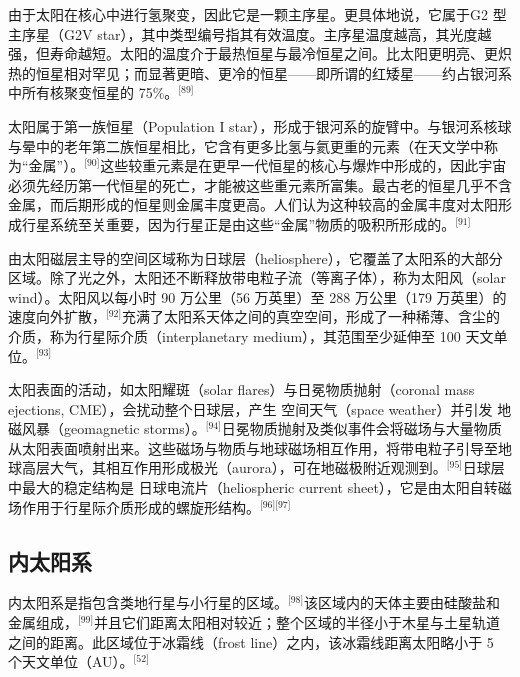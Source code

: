 由于太阳在核心中进行氢聚变，因此它是一颗主序星。更具体地说，它属于G2 型主序星（G2V star），其中类型编号指其有效温度。主序星温度越高，其光度越强，但寿命越短。太阳的温度介于最热恒星与最冷恒星之间。比太阳更明亮、更炽热的恒星相对罕见；而显著更暗、更冷的恒星——即所谓的红矮星——约占银河系中所有核聚变恒星的 75\%。\(^\text{[89]}\)

太阳属于第一族恒星（Population I star），形成于银河系的旋臂中。与银河系核球与晕中的老年第二族恒星相比，它含有更多比氢与氦更重的元素（在天文学中称为“金属”）。\(^\text{[90]}\)这些较重元素是在更早一代恒星的核心与爆炸中形成的，因此宇宙必须先经历第一代恒星的死亡，才能被这些重元素所富集。最古老的恒星几乎不含金属，而后期形成的恒星则金属丰度更高。人们认为这种较高的金属丰度对太阳形成行星系统至关重要，因为行星正是由这些“金属”物质的吸积所形成的。\(^\text{[91]}\)

由太阳磁层主导的空间区域称为日球层（heliosphere），它覆盖了太阳系的大部分区域。除了光之外，太阳还不断释放带电粒子流（等离子体），称为太阳风（solar wind）。太阳风以每小时 90 万公里（56 万英里）至 288 万公里（179 万英里）的速度向外扩散，\(^\text{[92]}\)充满了太阳系天体之间的真空空间，形成了一种稀薄、含尘的介质，称为行星际介质（interplanetary medium），其范围至少延伸至 100 天文单位。\(^\text{[93]}\)

太阳表面的活动，如太阳耀斑（solar flares）与日冕物质抛射（coronal mass ejections, CME），会扰动整个日球层，产生 空间天气（space weather）并引发 地磁风暴（geomagnetic storms）。\(^\text{[94]}\)日冕物质抛射及类似事件会将磁场与大量物质从太阳表面喷射出来。这些磁场与物质与地球磁场相互作用，将带电粒子引导至地球高层大气，其相互作用形成极光（aurora），可在地磁极附近观测到。\(^\text{[95]}\)日球层中最大的稳定结构是 日球电流片（heliospheric current sheet），它是由太阳自转磁场作用于行星际介质形成的螺旋形结构。\(^\text{[96][97]}\)
\subsection{内太阳系}
内太阳系是指包含类地行星与小行星的区域。\(^\text{[98]}\)该区域内的天体主要由硅酸盐和金属组成，\(^\text{[99]}\)并且它们距离太阳相对较近；整个区域的半径小于木星与土星轨道之间的距离。此区域位于冰霜线（frost line）之内，该冰霜线距离太阳略小于 5 个天文单位（AU）。\(^\text{[52]}\)
